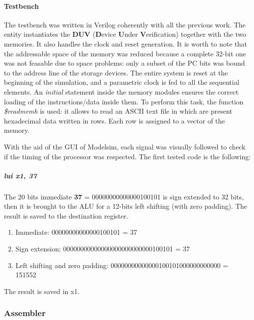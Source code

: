 \documentclass[a4paper]{article}
\begin{document}
\paragraph{Testbench} The testbench was written in Verilog coherently with all the previous work. The entity instantiates the \textbf{DUV} (\textbf{D}evice \textbf{U}nder \textbf{V}erification) together with the two memories. It also handles the clock and reset generation.
It is worth to note that the addressable space of the memory was reduced because a complete 32-bit one was not feasable due to space problems: only a subset of the PC bits was bound to the address line of the storage devices.
The entire system is reset at the beginning of the simulation, and a parametric clock is fed to all the sequential elements. 
An \textit{initial} statement inside the memory modules ensures the correct loading of the instructions/data inside them. To perform this task, the function \textit{\$readmemh} is used: it allows to read an ASCII text file in which are present hexadecimal data written in rows. Each row is assigned to a vector of the memory. 

With the aid of the GUI of Modelsim, each signal was visually followed to check if the timing of the processor was respected. The first tested code is the following:


\subparagraph*{lui x1, 37} The 20 bits immediate \textbf{37} = 00000000000000100101 is sign extended to 32 bits, then it is brought to the ALU for a 12-bits left shifting (with zero padding). The result is saved to the destination register. 
\begin{enumerate}
\item Immediate: 00000000000000100101 = 37
\item Sign extension: 00000000000000000000000000100101 = 37
\item Left shifting and zero padding: 00000000000000100101000000000000 = 151552
\end{enumerate} 
The result is saved in x1.

\subsubsection{Assembler}\label{sec:assembler}
\end{document}
